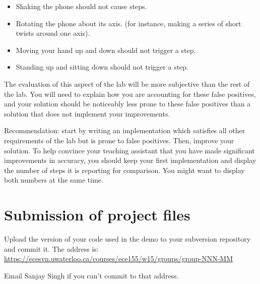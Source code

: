 \documentclass[10pt]{article}
\begin{document}
\begin{itemize}
\item Shaking the phone should not cause steps.
\item Rotating the phone about its axis. (for instance, making a series of short twists around one axis).
\item Moving your hand up and down should not trigger a step.
\item Standing up and sitting down should not trigger a step.
\end{itemize}

The evaluation of this aspect of the lab will be more subjective than the rest of the lab. You will need to explain how you are accounting for these false positives, and your solution should be noticeably less prone to these false positives than a solution that does not implement your improvements.

Recommendation: start by writing an implementation which satisfies all other requirements of the lab but is prone to false positives. Then, improve your solution. To help convince your teaching assistant that you have made significant improvements in accuracy, you should keep your first implementation and display the number of steps it is reporting for comparison. You might want to display both numbers at the same time.

\section{Submission of project files}

Upload the version of your code used in the demo to your subversion repository and commit it. The address is:
\url{https://ecesvn.uwaterloo.ca/courses/ece155/w15/groups/group-NNN-MM}

Email Sanjay Singh if you can't commit to that address.
\end{document}
